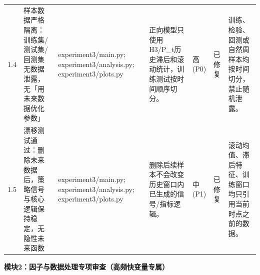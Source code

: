 \begin{longtable}{@{}L{0.045\textwidth}L{0.190\textwidth}L{0.140\textwidth}L{0.190\textwidth}L{0.060\textwidth}L{0.060\textwidth}L{0.205\textwidth}@{}}
1.4 & 样本数据严格隔离：训练集/\allowbreak{}测试集/\allowbreak{}回测集无数据泄露，无「用未来数据优化参数」 & experiment3/\allowbreak{}main.py;\allowbreak{} experiment3/\allowbreak{}analysis.py;\allowbreak{} experiment3/\allowbreak{}plots.py & 正向模型只使用H3/\allowbreak{}P\_\allowbreak{}t历史滞后和滚动统计，训练测试按时间顺序切分。 & 高(P0) & 已修复 & 训练、检验、回测或自然周样本均按时间切分，禁止随机泄露。 \\
1.5 & 漂移测试通过：删除未来数据后，策略信号与核心逻辑保持稳定，无隐性未来函数 & experiment3/\allowbreak{}main.py;\allowbreak{} experiment3/\allowbreak{}analysis.py;\allowbreak{} experiment3/\allowbreak{}plots.py & 删除后续样本不会改变历史窗口内已生成的信号/\allowbreak{}指标逻辑。 & 中(P1) & 已修复 & 滚动均值、滞后特征、训练窗口均只引用当前时点之前的数据。 \\
\end{longtable}
\endgroup

\textbf{模块2：因子与数据处理专项审查（高频快变量专属）}


